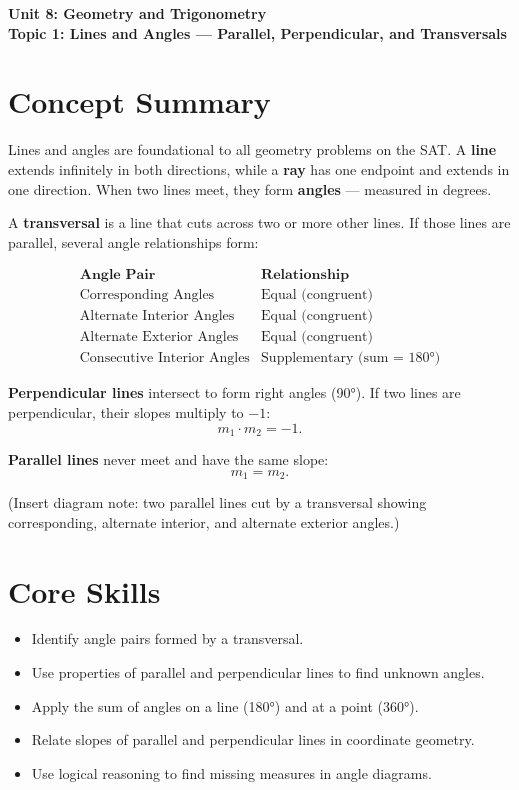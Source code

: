 \documentclass[12pt]{article}
\begin{document}
\begin{center}
    \LARGE \textbf{Unit 8: Geometry and Trigonometry} \\[6pt]
    \Large \textbf{Topic 1: Lines and Angles — Parallel, Perpendicular, and Transversals}
\end{center}

\vspace{1em}

\section*{Concept Summary}

Lines and angles are foundational to all geometry problems on the SAT.  
A \textbf{line} extends infinitely in both directions, while a \textbf{ray} has one endpoint and extends in one direction.  
When two lines meet, they form \textbf{angles} — measured in degrees.

A \textbf{transversal} is a line that cuts across two or more other lines.  
If those lines are parallel, several angle relationships form:

\[
\begin{array}{c|l}
\textbf{Angle Pair} & \textbf{Relationship} \\ \hline
\text{Corresponding Angles} & \text{Equal (congruent)} \\
\text{Alternate Interior Angles} & \text{Equal (congruent)} \\
\text{Alternate Exterior Angles} & \text{Equal (congruent)} \\
\text{Consecutive Interior Angles} & \text{Supplementary (sum = 180°)}
\end{array}
\]

\textbf{Perpendicular lines} intersect to form right angles (90°).  
If two lines are perpendicular, their slopes multiply to \(-1\):  
\[
m_1 \cdot m_2 = -1.
\]

\textbf{Parallel lines} never meet and have the same slope:  
\[
m_1 = m_2.
\]

(Insert diagram note: two parallel lines cut by a transversal showing corresponding, alternate interior, and alternate exterior angles.)

\section*{Core Skills}
\begin{itemize}
  \item Identify angle pairs formed by a transversal.
  \item Use properties of parallel and perpendicular lines to find unknown angles.
  \item Apply the sum of angles on a line (180°) and at a point (360°).
  \item Relate slopes of parallel and perpendicular lines in coordinate geometry.
  \item Use logical reasoning to find missing measures in angle diagrams.
\end{itemize}
\end{document}
